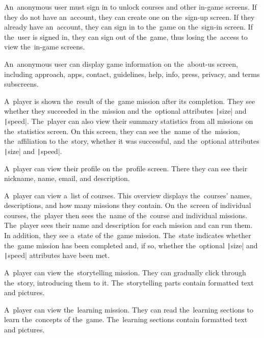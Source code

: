 \pagebreak
\begin{enumerate}[label=\textbf{F\arabic*}, ref=\labelenumi]
     An~anonymous user must sign in to unlock courses and other in-game screens.
    If they do not have an~account, they can create one on the~sign-up screen.
    If they already have an~account, they can sign in to the~game on the~sign-in screen.
    If the~user is signed in, they can sign out of the~game, thus losing the~access to view the~in-game screens.

     An~anonymous user can display game information on the~about-us screen, including approach, apps, contact, guidelines, help, info, press, privacy, and terms subscreens.

     A~player is shown the~result of the~game mission after its completion.
    They see whether they succeeded in the~mission and the~optional attributes \texttt|size| and \texttt|speed|.
    The~player can also view their summary statistics from all missions on the~statistics screen.
    On this screen, they can see the~name of the~mission, the~affiliation to the~story, whether it was successful, and the~optional attributes \texttt|size| and \texttt|speed|.

     A~player can view their profile on the~profile screen.
    There they can see their nickname, name, email, and description.

     A~player can view a~list of courses.
    This overview displays the~courses' names, descriptions, and how many missions they contain.
    On the~screen of individual courses, the~player then sees the~name of the~course and individual missions.
    The~player sees their name and description for each mission and can run them.
    In addition, they see a~state of the~game mission.
    The~state indicates whether the~game mission has been completed and, if so, whether the~optional \texttt|size| and \texttt|speed| attributes have been met.

     A~player can view the~storytelling mission.
    They can gradually click through the~story, introducing them to it.
    The~storytelling parts contain formatted text and pictures.

     A~player can view the~learning mission.
    They can read the~learning sections to learn the~concepts of the~game.
    \linebreak
    The~learning sections contain formatted text and pictures. 
    

\end{enumerate}
